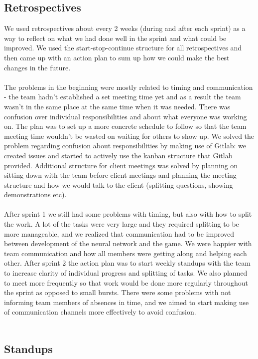 \documentclass{l3proj}
\begin{document}
\subsection*{Retrospectives}

We used retrospectives about every 2 weeks (during and after each sprint) as a way to reflect on what we had done well in the sprint and what could be improved. We used the start-stop-continue structure for all retrospectives and then came up with an action plan to sum up how we could make the best changes in the future.
\\\\
The problems in the beginning were mostly related to timing and communication - the team hadn't established a set meeting time yet and as a result the team wasn't in the same place at the same time when it was needed. There was confusion over individual responsibilities and about what everyone was working on. The plan was to set up a more concrete schedule to follow so that the team meeting time wouldn't be wasted on waiting for others to show up. We solved the problem regarding confusion about responsibilities by making use of Gitlab: we created issues and started to actively use the kanban structure that Gitlab provided. Additional structure for client meetings was solved by planning on sitting down with the team before client meetings and planning the meeting structure and how we would talk to the client (splitting questions, showing demonstrations etc).
\\\\
After sprint 1 we still had some problems with timing, but also with how to split the work. A lot of the tasks were very large and they required splitting to be more manageable, and we realized that communication had to be improved between development of the neural network and the game. We were happier with team communication and how all members were getting along and helping each other.
After sprint 2 the action plan was to start weekly standups with the team to increase clarity of individual progress and splitting of tasks. We also planned to meet more frequently so that work would be done more regularly throughout the sprint as opposed to small bursts. There were some problems with not informing team members of absences in time, and we aimed to start making use of communication channels more effectively to avoid confusion.
\\\\

\subsection*{Standups}
\end{document}

